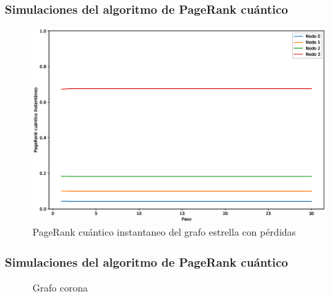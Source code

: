 \documentclass[xetex,mathserif,serif, 8pt]{beamer}
\begin{document}
\begin{frame}
    \frametitle{Simulaciones del algoritmo de PageRank cuántico}

    \begin{figure}[H]
        \centering
        \includegraphics[width=0.9\linewidth]{img/star-inst-lossy.eps}
        \caption{PageRank cuántico instantaneo del grafo estrella con pérdidas}
    \end{figure}

\end{frame}





\begin{frame}
    \frametitle{Simulaciones del algoritmo de PageRank cuántico}


\begin{figure}[H]
    \centering
    \caption[Grafo corona]{Grafo corona}
    \label{fig:crown}
\end{figure}

\end{frame}
\end{document}

